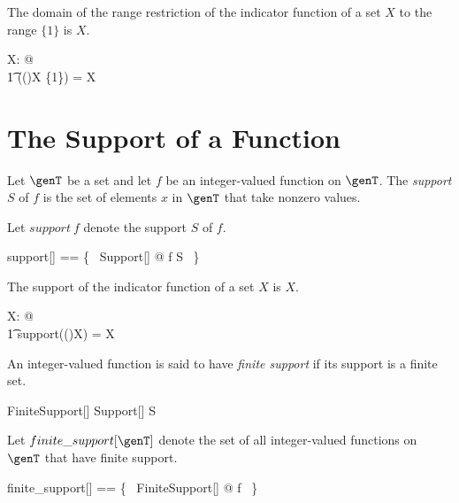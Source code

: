\documentclass{amsart}
\begin{document}
\begin{remark}
The domain of the range restriction of the indicator function of a set $X$ to the range $\{1\}$ is $X$.
\begin{zed}
	\forall X: \power \setT @ \\
	\t1	\dom((\indF \setT)X \rres \{1\}) = X
\end{zed}
\end{remark}

\section{The Support of a Function}

Let $\genT$ be a set and let $f$ be an integer-valued function on $\genT$.
The \textit{support} $S$ of $f$ is the set of elements $x$ in $\genT$  that take nonzero values.


Let $support~f$ denote the support $S$ of $f$.

\begin{zed}
	support[\genT] == \{~ Support[\genT] @ f \mapsto S ~\}
\end{zed}

\begin{example}
The support of the indicator function of a set $X$ is $X$.
\begin{zed}
	\forall X: \power \setT @ \\
	\t1 support((\indF \setT)X) = X
\end{zed}
\end{example}

An integer-valued function is said to have \textit{finite support} if its support is a finite set.

\begin{schema}{FiniteSupport}[\genT]
	Support[\genT]
\where
	S \in \finset \genT
\end{schema}

Let $finite\_support[\genT]$ denote the set of all integer-valued functions on $\genT$ that have finite support.

\begin{zed}
	finite\_support[\genT] == \{~ FiniteSupport[\genT] @ f ~\}
\end{zed}

\begin{remark}
\end{remark}

\printbibliography
\end{document}
